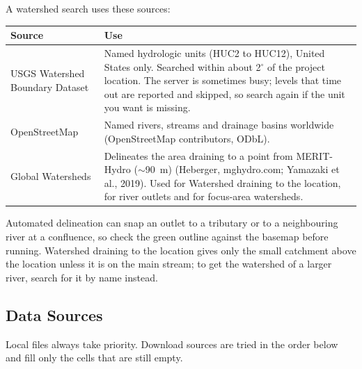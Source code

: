         A watershed search uses these sources:

        \begin{tabular}{p{}p{}}
        \hline
        Source & Use \\
        \hline
        USGS Watershed Boundary Dataset & Named hydrologic units (HUC2 to HUC12), United States only.  Searched within about 2$^\circ$ of the project location.  The server is sometimes busy; levels that time out are reported and skipped, so search again if the unit you want is missing. \\
        OpenStreetMap & Named rivers, streams and drainage basins worldwide (OpenStreetMap contributors, ODbL). \\
        Global Watersheds & Delineates the area draining to a point from MERIT-Hydro ($\sim$90~m) (Heberger, mghydro.com; Yamazaki et al., 2019).  Used for {\sf Watershed draining to the location}, for river outlets and for focus-area watersheds. \\
        \hline
        \end{tabular}

        \medskip
        Automated delineation can snap an outlet to a tributary or to a neighbouring river at a confluence, so check the green outline against the basemap before running.  {\sf Watershed draining to the location} gives only the small catchment above the location unless it is on the main stream; to get the watershed of a larger river, search for it by name instead.

    \subsection{Data Sources}
        Local files always take priority.  Download sources are tried in the order below and fill only the cells that are still empty.

